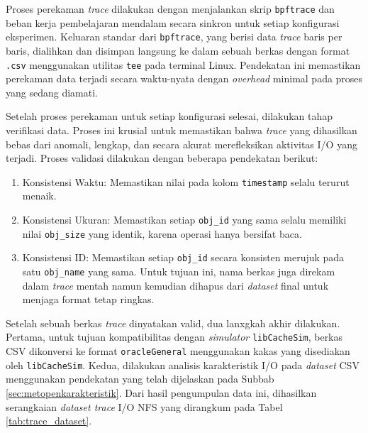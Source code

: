 Proses perekaman \textit{trace} dilakukan dengan menjalankan skrip \texttt{bpftrace} dan beban kerja pembelajaran mendalam secara sinkron untuk setiap konfigurasi eksperimen. Keluaran standar dari \texttt{bpftrace}, yang berisi data \textit{trace} baris per baris, dialihkan dan disimpan langsung ke dalam sebuah berkas dengan format \texttt{.csv} menggunakan utilitas \texttt{tee} pada terminal Linux. Pendekatan ini memastikan perekaman data terjadi secara waktu-nyata dengan \textit{overhead} minimal pada proses yang sedang diamati.

Setelah proses perekaman untuk setiap konfigurasi selesai, dilakukan tahap verifikasi data. Proses ini krusial untuk memastikan bahwa \textit{trace} yang dihasilkan bebas dari anomali, lengkap, dan secara akurat merefleksikan aktivitas I/O yang terjadi. Proses validasi dilakukan dengan beberapa pendekatan berikut:
\begin{enumerate}
    \item Konsistensi Waktu: Memastikan nilai pada kolom \texttt{timestamp} selalu terurut menaik.
    \item Konsistensi Ukuran: Memastikan setiap \texttt{obj\_id} yang sama selalu memiliki nilai \texttt{obj\_size} yang identik, karena operasi hanya bersifat baca.
    \item Konsistensi ID: Memastikan setiap \texttt{obj\_id} secara konsisten merujuk pada satu \texttt{obj\_name} yang sama. Untuk tujuan ini, nama berkas juga direkam dalam \textit{trace} mentah namun kemudian dihapus dari \textit{dataset} final untuk menjaga format tetap ringkas.
\end{enumerate}


Setelah sebuah berkas \textit{trace} dinyatakan valid, dua lanxgkah akhir dilakukan. Pertama, untuk tujuan kompatibilitas dengan \textit{simulator} \texttt{libCacheSim}, berkas CSV dikonversi ke format \texttt{oracleGeneral} menggunakan kakas yang disediakan oleh \texttt{libCacheSim}. Kedua, dilakukan analisis karakteristik I/O pada \textit{dataset} CSV menggunakan pendekatan yang telah dijelaskan pada Subbab \ref{sec:metopenkarakteristik}. Dari hasil pengumpulan data ini, dihasilkan serangkaian \textit{dataset trace} I/O NFS yang dirangkum pada Tabel \ref{tab:trace_dataset}.

